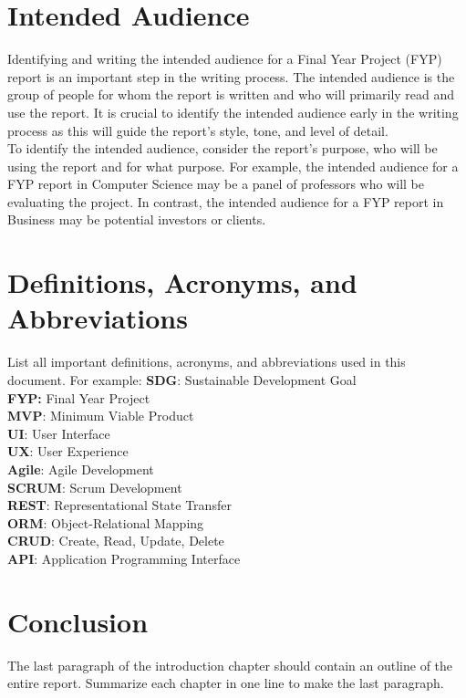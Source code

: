 \section{Intended Audience}
Identifying and writing the intended audience for a Final Year Project (FYP) report is an important step in the writing process. The intended audience is the group of people for whom the report is written and who will primarily read and use the report. It is crucial to identify the intended audience early in the writing process as this will guide the report's style, tone, and level of detail.\\
To identify the intended audience, consider the report's purpose, who will be using the report and for what purpose. For example, the intended audience for a FYP report in Computer Science may be a panel of professors who will be evaluating the project. In contrast, the intended audience for a FYP report in Business may be potential investors or clients.
\section{Definitions, Acronyms, and Abbreviations}
List all important definitions, acronyms, and abbreviations used in this document. For example: 
\textbf{SDG}: Sustainable Development Goal\\
\textbf{FYP:} Final Year Project\\
\textbf{MVP}: Minimum Viable Product\\
\textbf{UI}: User Interface\\
\textbf{UX}: User Experience\\
\textbf{Agile}: Agile Development\\
\textbf{SCRUM}: Scrum Development\\
\textbf{REST}: Representational State Transfer\\
\textbf{ORM}: Object-Relational Mapping\\
\textbf{CRUD}: Create, Read, Update, Delete\\
\textbf{API}: Application Programming Interface
\section{Conclusion}
The last paragraph of the introduction chapter should contain an outline of the entire report. Summarize each chapter in one line to make the last paragraph.

